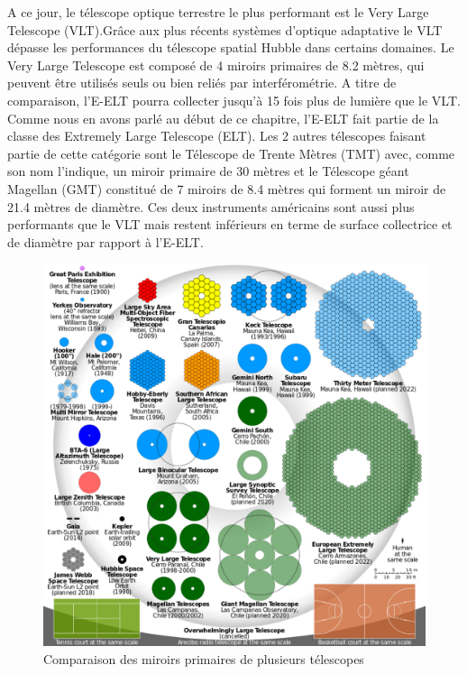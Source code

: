 A ce jour, le télescope optique terrestre le plus performant est le Very Large Telescope (VLT).Grâce aux plus récents systèmes d'optique adaptative le VLT dépasse les performances du télescope spatial Hubble dans certains domaines. Le Very Large Telescope est composé de 4 miroirs primaires de 8.2 mètres, qui peuvent être utilisés seuls ou bien reliés par interférométrie.  A titre de comparaison, l'E-ELT pourra collecter jusqu'à 15 fois plus de lumière que le VLT. Comme nous en avons parlé au début de ce chapitre, l'E-ELT fait partie de la classe des Extremely Large Telescope (ELT). Les 2 autres télescopes faisant partie de cette catégorie sont le Télescope de Trente Mètres (TMT) avec, comme son nom l'indique, un miroir primaire de 30 mètres et le Télescope géant Magellan (GMT) constitué de 7 miroirs de 8.4 mètres qui forment un miroir de 21.4 mètres de diamètre. Ces deux instruments américains sont aussi plus performants que le VLT mais restent inférieurs en terme de surface collectrice et de diamètre par rapport à l'E-ELT.  

\begin{figure}[H]
	\centering
	\includegraphics[scale=0.2]{images/comp_tscp}
	\caption[Comparaison des miroirs primaires de plusieurs télescopes \label{Fig. 4.2}\newline \url{https://en.wikipedia.org/wiki/Segmented_mirror}]{Comparaison des miroirs primaires de plusieurs télescopes \label{Fig. 4.2}}
	\label{Fig. 4.2}
\end{figure}

